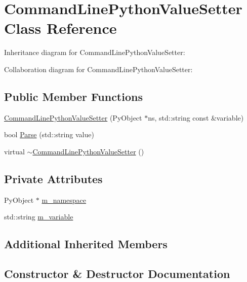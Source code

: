 \hypertarget{classCommandLinePythonValueSetter}{}\section{Command\+Line\+Python\+Value\+Setter Class Reference}
\label{classCommandLinePythonValueSetter}


Inheritance diagram for Command\+Line\+Python\+Value\+Setter\+:


Collaboration diagram for Command\+Line\+Python\+Value\+Setter\+:
\subsection*{Public Member Functions}
\begin{DoxyCompactItemize}
\item 
\hyperlink{classCommandLinePythonValueSetter_a170317dcf46384d7aab74366d8c0fa48}{Command\+Line\+Python\+Value\+Setter} (Py\+Object $\ast$ns, std\+::string const \&variable)
\item 
bool \hyperlink{classCommandLinePythonValueSetter_acb3461b556cce4cd0d47e30e91e9bfda}{Parse} (std\+::string value)
\item 
virtual \hyperlink{classCommandLinePythonValueSetter_ab6104625a5ab6e9162807e48d703676f}{$\sim$\+Command\+Line\+Python\+Value\+Setter} ()
\end{DoxyCompactItemize}
\subsection*{Private Attributes}
\begin{DoxyCompactItemize}
\item 
Py\+Object $\ast$ \hyperlink{classCommandLinePythonValueSetter_a9e34acae608b743da05378c9587ee7ad}{m\+\_\+namespace}
\item 
std\+::string \hyperlink{classCommandLinePythonValueSetter_a01a5f8c76aae45d325d635e180e4a6ca}{m\+\_\+variable}
\end{DoxyCompactItemize}
\subsection*{Additional Inherited Members}


\subsection{Constructor \& Destructor Documentation}
